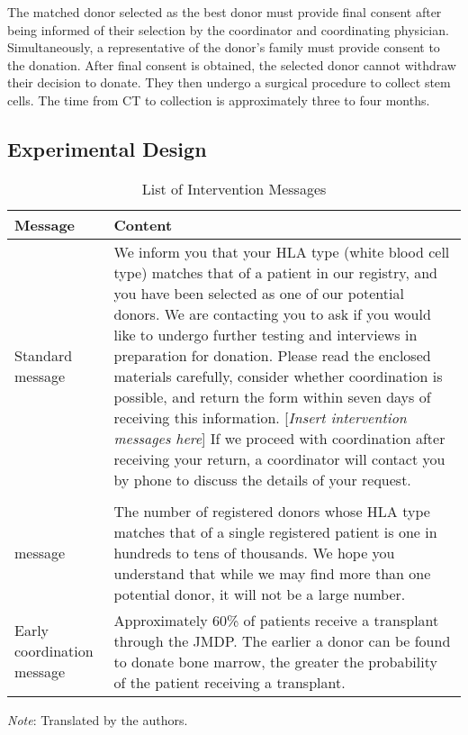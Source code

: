 \documentclass[12pt, a4paper]{article}
\newcommand{\revise}[1]{{\color{red}{#1}}}
\begin{document}
The matched donor selected as the best donor must provide final consent after being informed of their selection by the coordinator and coordinating physician. Simultaneously, a representative of the donor's family must provide consent to the donation. After final consent is obtained, the selected donor cannot withdraw their decision to donate. They then undergo a surgical procedure to collect stem cells. The time from CT to collection is approximately three to four months.

\hypertarget{design}{%
\subsection{Experimental Design}\label{design}}

\begin{table}

\caption{\label{tab:list-message}List of Intervention Messages}
\centering
\fontsize{8}{10}\selectfont
\begin{threeparttable}
\begin{tabular}[t]{l>{\raggedright\arraybackslash}p{40em}}
\toprule
Message & Content\\
\midrule
Standard message & We inform you that your HLA type (white blood cell type) matches that of a patient in our registry, and you have been selected as one of our potential donors. We are contacting you to ask if you would like to undergo further testing and interviews in preparation for donation. Please read the enclosed materials carefully, consider whether coordination is possible, and return the form within seven days of receiving this information. [\emph{Insert intervention messages here}] If we proceed with coordination after receiving your return, a coordinator will contact you by phone to discuss the details of your request.\\
\addlinespace[0.3em]
\multicolumn{2}{l}{\textbf{Intervention message}}\\
\hspace{1em}\revise{Matching difficulty} message & The number of registered donors whose HLA type matches that of a single registered patient is one in hundreds to tens of thousands. We hope you understand that while we may find more than one potential donor, it will not be a large number.\\
\hspace{1em}Early coordination message & Approximately 60\% of patients receive a transplant through the JMDP. The earlier a donor can be found to donate bone marrow, the greater the probability of the patient receiving a transplant.\\
\bottomrule
\end{tabular}
\begin{tablenotes}
\item \emph{Note}: Translated by the authors.
\end{tablenotes}
\end{threeparttable}
\end{table}
\end{document}
